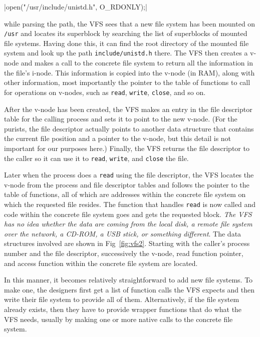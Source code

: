 \begin{center}
  |open("/usr/include/unistd.h", O_RDONLY);|
\end{center}

while parsing the path, the VFS sees that a new file system has been mounted on
\texttt{/usr} and locates its superblock by searching the list of superblocks of mounted
file systems. Having done this, it can find the root directory of the mounted file system
and look up the path \texttt{include/unistd.h} there. The VFS then creates a v-node and
makes a call to the concrete file system to return all the information in the file's
i-node. This information is copied into the v-node (in RAM), along with other information,
most importantly the pointer to the table of functions to call for operations on v-nodes,
such as \texttt{read}, \texttt{write}, \texttt{close}, and so on.

After the v-node has been created, the VFS makes an entry in the file descriptor table for
the calling process and sets it to point to the new v-node. (For the purists, the file
descriptor actually points to another data structure that contains the current file
position and a pointer to the v-node, but this detail is not important for our purposes
here.) Finally, the VFS returns the file descriptor to the caller so it can use it to
\texttt{read}, \texttt{write}, and \texttt{close} the file.

Later when the process does a \texttt{read} using the file descriptor, the VFS locates the
v-node from the process and file descriptor tables and follows the pointer to the table of
functions, all of which are addresses within the concrete file system on which the
requested file resides. The function that handles \texttt{read} is now called and code
within the concrete file system goes and gets the requested block. \emph{The VFS has no idea
  whether the data are coming from the local disk, a remote file system over the network,
  a CD-ROM, a USB stick, or something different}. The data structures involved are shown
in Fig~\ref{fig:vfs2}. Starting with the caller's process number and the file descriptor,
successively the v-node, read function pointer, and access function within the concrete
file system are located.

In this manner, it becomes relatively straightforward to add new file systems.  To make
one, the designers first get a list of function calls the VFS expects and then write their
file system to provide all of them. Alternatively, if the file system already exists, then
they have to provide wrapper functions that do what the VFS needs, usually by making one
or more native calls to the concrete file system.

